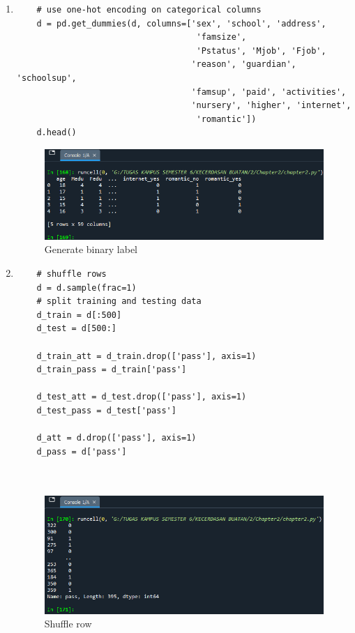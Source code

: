 \begin{enumerate}
	\item
	      \begin{verbatim}
	# use one-hot encoding on categorical columns
	d = pd.get_dummies(d, columns=['sex', 'school', 'address', 
									'famsize', 
									'Pstatus', 'Mjob', 'Fjob', 
	                               'reason', 'guardian', 'schoolsup', 
								   'famsup', 'paid', 'activities',
	                               'nursery', 'higher', 'internet', 
									'romantic'])
	d.head()
\end{verbatim}
	      \begin{figure}[ht]
		      \centerline{\includegraphics[scale=0.7]{figures/Chapter2c.png}}
		      \caption{Generate binary label}
		      \label{Generate binary label}
	      \end{figure}

	      \newpage
	\item
	      \begin{verbatim}
	# shuffle rows
	d = d.sample(frac=1)
	# split training and testing data
	d_train = d[:500]
	d_test = d[500:]

	d_train_att = d_train.drop(['pass'], axis=1)
	d_train_pass = d_train['pass']

	d_test_att = d_test.drop(['pass'], axis=1)
	d_test_pass = d_test['pass']

	d_att = d.drop(['pass'], axis=1)
	d_pass = d['pass']

	
\end{verbatim}
	      \begin{figure}[ht]
		      \centerline{\includegraphics[scale=0.7]{figures/Chapter2d.png}}
		      \caption{Shuffle row}
		      \label{Shuffle row}
	      \end{figure}


\end{enumerate}
